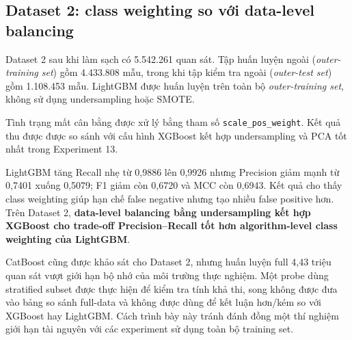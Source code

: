 \subsection{Dataset 2: class weighting so với data-level balancing}

Dataset 2 sau khi làm sạch có 5.542.261 quan sát. Tập huấn luyện ngoài
(\textit{outer-training set}) gồm 4.433.808 mẫu, trong khi tập kiểm tra
ngoài (\textit{outer-test set}) gồm 1.108.453 mẫu. LightGBM được huấn
luyện trên toàn bộ \textit{outer-training set}, không sử dụng
undersampling hoặc SMOTE.

Tình trạng mất cân bằng được xử lý bằng tham số
\texttt{scale\_pos\_weight}. Kết quả thu được được so sánh với cấu hình
XGBoost kết hợp undersampling và PCA tốt nhất trong Experiment 13.

\begin{table}[H]
\centering
\scriptsize
\caption{Dataset 2: so sánh XGBoost cải tiến và LightGBM weighted trên full data}
\label{tab:d2_new_methods}
\end{table}

LightGBM tăng Recall nhẹ từ 0,9886 lên 0,9926 nhưng Precision giảm mạnh từ 0,7401 xuống 0,5079; F1 giảm còn 0,6720 và MCC còn 0,6943. Kết quả cho thấy class weighting giúp hạn chế false negative nhưng tạo nhiều false positive hơn. Trên Dataset 2, \textbf{data-level balancing bằng undersampling kết hợp XGBoost cho trade-off Precision--Recall tốt hơn algorithm-level class weighting của LightGBM}.

CatBoost cũng được khảo sát cho Dataset 2, nhưng huấn luyện full 4,43 triệu quan sát vượt giới hạn bộ nhớ của môi trường thực nghiệm. Một probe dùng stratified subset được thực hiện để kiểm tra tính khả thi, song không được đưa vào bảng so sánh full-data và không được dùng để kết luận hơn/kém so với XGBoost hay LightGBM. Cách trình bày này tránh đánh đồng một thí nghiệm giới hạn tài nguyên với các experiment sử dụng toàn bộ training set.

